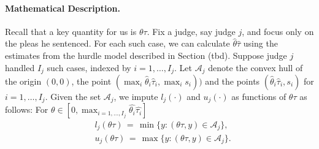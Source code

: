 \documentclass[11pt, oneside]{article}   	%
\theoremstyle{ModifiedStyle}
\begin{document}
    \paragraph{Mathematical Description.} Recall that a key quantity for us is $\theta\tau$. Fix a judge, say judge $j$, and focus only on the pleas he sentenced. For each such case, we can calculate $\hat{\theta}\hat{\tau}$ using the estimates from the hurdle model described in Section (tbd). Suppose judge $j$ handled $I_j$ such cases, indexed by $i=1,\ldots,I_j$. Let $\mathcal{A}_j$ denote the convex hull of the origin $(0,0)$, the point $(\max_i \hat{\theta}_i \hat{\tau}_i, \max_i s_i))$ and the points $(\hat{\theta}_i\hat{\tau}_i,s_i)$ for $i=1,\ldots,I_j$. Given the set $\mathcal{A}_j$, we impute $l_j(\cdot)$ and $u_j(\cdot)$ as functions of $\theta\tau$ as follows: For $\theta \in [0,\max_{i=1,...,I_j} \hat{\theta_i}\hat{\tau_i}]$
		\begin{align*}
			&l_j(\theta\tau) \,=\, \min\{y:(\theta\tau,y)\in\mathcal{A}_j \}, \\
			&u_j(\theta\tau) \,=\, \max\{y:(\theta\tau,y)\in\mathcal{A}_j \}.
		\end{align*}

\end{document}
